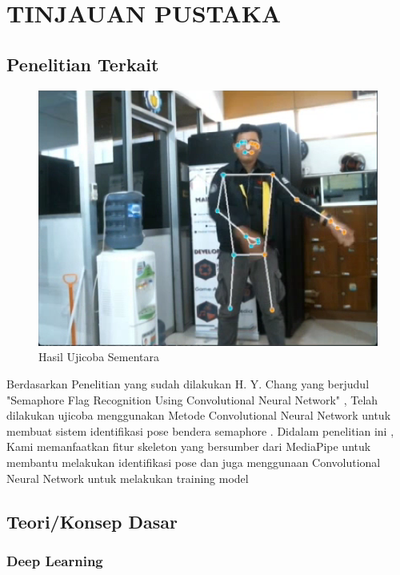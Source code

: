 \section{TINJAUAN PUSTAKA}

\subsection{Penelitian Terkait}
\begin{figure} [ht] \centering
    \includegraphics[scale=0.7]{gambar/contoh.png}
    \caption{Hasil Ujicoba Sementara}
    \label{fig:Ujicoba Sementara}
  \end{figure}
Berdasarkan Penelitian yang sudah dilakukan H. Y. Chang yang berjudul "Semaphore Flag Recognition Using Convolutional Neural Network" , Telah dilakukan ujicoba menggunakan Metode Convolutional Neural Network untuk membuat sistem identifikasi pose bendera semaphore . Didalam penelitian ini , Kami memanfaatkan fitur skeleton yang bersumber dari MediaPipe untuk membantu melakukan identifikasi pose dan juga menggunaan Convolutional Neural Network untuk melakukan training model

\subsection{Teori/Konsep Dasar}

\subsubsection{Deep Learning}

